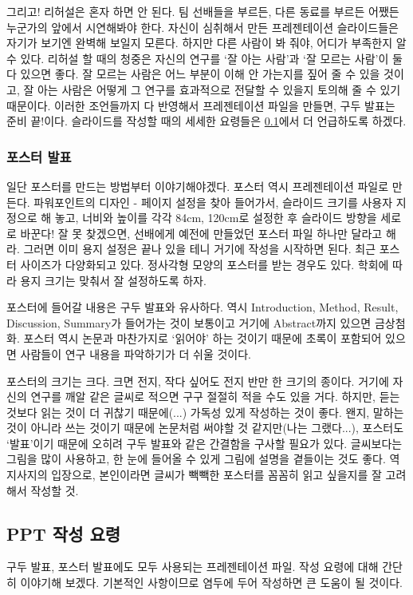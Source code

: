 그리고! 리허설은 혼자 하면 안 된다. 팀 선배들을 부르든, 다른 동료를 부르든 어쨌든
누군가의 앞에서 시연해봐야 한다. 자신이 심취해서 만든 프레젠테이션 슬라이드들은
자기가 보기엔 완벽해 보일지 모른다. 하지만 다른 사람이 봐 줘야, 어디가 부족한지
알 수 있다. 리허설 할 때의 청중은 자신의 연구를 ‘잘 아는 사람’과 ‘잘 모르는
사람’이 둘 다 있으면 좋다. 잘 모르는 사람은 어느 부분이 이해 안 가는지를 짚어 줄
수 있을 것이고, 잘 아는 사람은 어떻게 그 연구를 효과적으로 전달할 수 있을지
토의해 줄 수 있기 때문이다. 이러한 조언들까지 다 반영해서 프레젠테이션 파일을
만들면, 구두 발표는 준비 끝!이다. 슬라이드를 작성할 때의 세세한 요령들은
\ref{sec:PPT}에서 더 언급하도록 하겠다.

\subsubsection{포스터 발표}
일단 포스터를 만드는 방법부터 이야기해야겠다. 포스터 역시 프레젠테이션 파일로
만든다. 파워포인트의 디자인 - 페이지 설정을 찾아 들어가서, 슬라이드 크기를 사용자
지정으로 해 놓고, 너비와 높이를 각각 84cm, 120cm로 설정한 후 슬라이드 방향을
세로로 바꾼다! 잘 못 찾겠으면, 선배에게 예전에 만들었던 포스터 파일 하나만 달라고
해라. 그러면 이미 용지 설정은 끝나 있을 테니 거기에 작성을 시작하면 된다.  최근
포스터 사이즈가 다양화되고 있다. 정사각형 모양의 포스터를 받는 경우도
있다. 학회에 따라 용지 크기는 맞춰서 잘 설정하도록 하자.

포스터에 들어갈 내용은 구두 발표와 유사하다. 역시 Introduction, Method, Result,
Discussion, Summary가 들어가는 것이 보통이고 거기에 Abstract까지 있으면
금상첨화. 포스터 역시 논문과 마찬가지로 ‘읽어야’ 하는 것이기 때문에 초록이
포함되어 있으면 사람들이 연구 내용을 파악하기가 더 쉬울 것이다.

포스터의 크기는 크다. 크면 전지, 작다 싶어도 전지 반만 한 크기의 종이다. 거기에
자신의 연구를 깨알 같은 글씨로 적으면 구구 절절히 적을 수도 있을 거다. 하지만,
듣는 것보다 읽는 것이 더 귀찮기 때문에(...) 가독성 있게 작성하는 것이
좋다. 왠지, 말하는 것이 아니라 쓰는 것이기 때문에 논문처럼 써야할 것 같지만(나는
그랬다...), 포스터도 ‘발표’이기 때문에 오히려 구두 발표와 같은 간결함을 구사할
필요가 있다. 글씨보다는 그림을 많이 사용하고, 한 눈에 들어올 수 있게 그림에
설명을 곁들이는 것도 좋다. 역지사지의 입장으로, 본인이라면 글씨가 빽빽한 포스터를
꼼꼼히 읽고 싶을지를 잘 고려해서 작성할 것.
 
\subsection{PPT 작성 요령}\label{sec:PPT}
구두 발표, 포스터 발표에도 모두 사용되는 프레젠테이션 파일. 작성 요령에 대해
간단히 이야기해 보겠다. 기본적인 사항이므로 염두에 두어 작성하면 큰 도움이 될
것이다.
 
